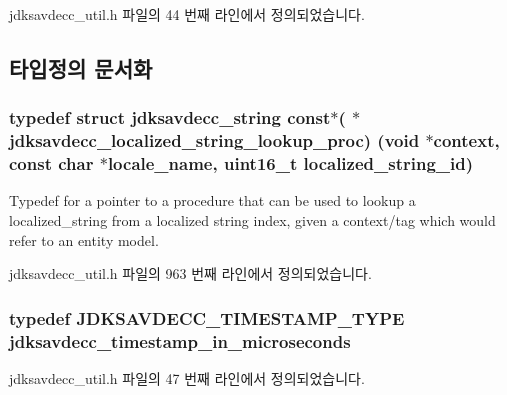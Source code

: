 jdksavdecc\+\_\+util.\+h 파일의 44 번째 라인에서 정의되었습니다.



\subsection{타입정의 문서화}
\subsubsection[{\texorpdfstring{jdksavdecc\+\_\+localized\+\_\+string\+\_\+lookup\+\_\+proc}{jdksavdecc_localized_string_lookup_proc}}]{\setlength{\rightskip}{0pt plus 5cm}typedef struct {\bf jdksavdecc\+\_\+string} const$\ast$( $\ast$ jdksavdecc\+\_\+localized\+\_\+string\+\_\+lookup\+\_\+proc) (void $\ast$context, const char $\ast$locale\+\_\+name, uint16\+\_\+t localized\+\_\+string\+\_\+id)}\hypertarget{group__util_ga5f9c1f7d10b0f5e8d7c250e8804e6d2e}{}\label{group__util_ga5f9c1f7d10b0f5e8d7c250e8804e6d2e}
Typedef for a pointer to a procedure that can be used to lookup a localized\+\_\+string from a localized string index, given a context/tag which would refer to an entity model. 

jdksavdecc\+\_\+util.\+h 파일의 963 번째 라인에서 정의되었습니다.

\subsubsection[{\texorpdfstring{jdksavdecc\+\_\+timestamp\+\_\+in\+\_\+microseconds}{jdksavdecc_timestamp_in_microseconds}}]{\setlength{\rightskip}{0pt plus 5cm}typedef {\bf J\+D\+K\+S\+A\+V\+D\+E\+C\+C\+\_\+\+T\+I\+M\+E\+S\+T\+A\+M\+P\+\_\+\+T\+Y\+PE} {\bf jdksavdecc\+\_\+timestamp\+\_\+in\+\_\+microseconds}}\hypertarget{group__util_gaca5142930a1fb7fba0d88a9c2d16a848}{}\label{group__util_gaca5142930a1fb7fba0d88a9c2d16a848}


jdksavdecc\+\_\+util.\+h 파일의 47 번째 라인에서 정의되었습니다.

